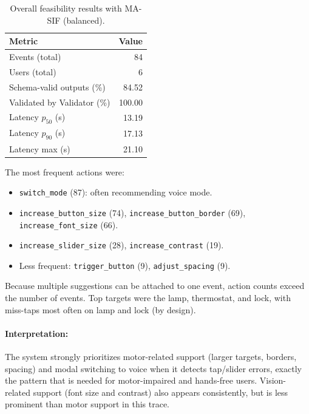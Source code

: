 \documentclass[openany]{book}
\begin{document}
\begin{table}[htb]
  \centering
  \caption{Overall feasibility results with MA-SIF (balanced).}
  \label{tab:overall-feasibility}
  \begin{tabular}{lr}
    \toprule
    \textbf{Metric} & \textbf{Value} \\
    \midrule
    Events (total) & 84 \\
    Users (total) & 6 \\
    Schema-valid outputs (\%) & 84.52 \\
    Validated by Validator (\%) & 100.00 \\
    Latency $p_{50}$ (s) & 13.19 \\
    Latency $p_{90}$ (s) & 17.13 \\
    Latency max (s) & 21.10 \\
    \bottomrule
  \end{tabular}
\end{table}

The most frequent actions were:
\begin{itemize}
    \item \texttt{switch\_mode} (87): often recommending voice mode.
    \item \texttt{increase\_button\_size} (74), \texttt{increase\_button\_border} (69), \texttt{increase\_font\_size} (66).
    \item \texttt{increase\_slider\_size} (28), \texttt{increase\_contrast} (19).
    \item Less frequent: \texttt{trigger\_button} (9), \texttt{adjust\_spacing} (9).
\end{itemize}
Because multiple suggestions can be attached to one event, action counts exceed the number of events. Top targets were the lamp, thermostat, and lock, with miss-taps most often on lamp and lock (by design).

\paragraph{Interpretation:} The system strongly prioritizes motor-related support (larger targets, borders, spacing) and modal switching to voice when it detects tap/slider errors, exactly the pattern that is needed for motor-impaired and hands-free users. Vision-related support (font size and contrast) also appears consistently, but is less prominent than motor support in this trace.
\end{document}
